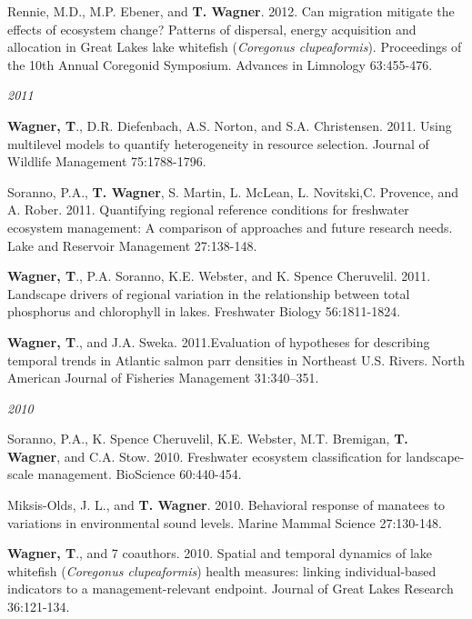 \documentclass[10pt]{article}
\begin{document}
\begin{flushleft}
\begin{etaremune}[start=24]
\item Rennie, M.D., M.P. Ebener, and {\bf T. Wagner}. 2012. Can migration mitigate the effects of ecosystem change? Patterns of dispersal, energy acquisition and allocation in Great Lakes lake whitefish (\emph{Coregonus clupeaformis}). Proceedings of the 10th Annual Coregonid Symposium. Advances in Limnology 63:455-476. 

\end{etaremune}
\emph{2011}
\begin{etaremune}[start=22]
\item {\bf Wagner, T}., D.R. Diefenbach, A.S. Norton, and S.A. Christensen. 2011. Using multilevel models to quantify heterogeneity in resource selection. Journal of Wildlife Management 75:1788-1796. 

\item Soranno, P.A., {\bf T. Wagner}, S. Martin, L. McLean, L. Novitski,C. Provence, and A. Rober. 2011. Quantifying regional reference conditions for freshwater ecosystem management: A comparison of approaches and future research needs. Lake and Reservoir Management 27:138-148. 

\item {\bf Wagner, T}., P.A. Soranno, K.E. Webster, and K. Spence Cheruvelil. 2011. Landscape drivers of regional variation in the relationship between total phosphorus and chlorophyll in lakes. Freshwater Biology 56:1811-1824.

\item {\bf Wagner, T}., and J.A. Sweka. 2011.Evaluation of hypotheses for describing temporal trends in Atlantic salmon parr densities in Northeast U.S. Rivers. North American Journal of Fisheries Management 31:340–351. 

\end{etaremune}
\emph{2010}
\begin{etaremune}[start=18]
\item Soranno, P.A., K. Spence Cheruvelil, K.E. Webster, M.T. Bremigan, {\bf T. Wagner}, and C.A. Stow. 2010. Freshwater ecosystem classification for landscape-scale management. BioScience 60:440-454.

\item Miksis-Olds, J. L., and {\bf T. Wagner}. 2010. Behavioral response of manatees to variations in environmental sound levels. Marine Mammal Science 27:130-148.

\item {\bf Wagner, T}., and 7 coauthors. 2010. Spatial and temporal dynamics of lake whitefish (\emph{Coregonus clupeaformis}) health measures: linking individual-based indicators to a management-relevant endpoint. Journal of Great Lakes Research 36:121-134.


\end{etaremune}
\end{flushleft}
\end{document}
